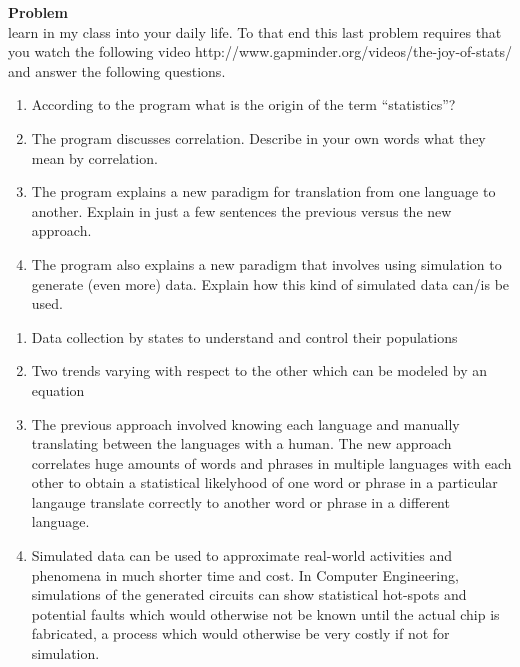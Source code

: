 \documentclass[12pt]{article}
\newenvironment{Ex}{\textbf{Problem}\vspace{.75em}\\}{}
\begin{document}
\begin{enumerate}
\begin{Ex}
    learn in my class into your daily life. To that end this last
    problem requires that you watch the following video
    http://www.gapminder.org/videos/the-joy-of-stats/ and answer the
    following questions.
    \begin{enumerate}
    \item According to the program what is the origin of the term
      ``statistics''?
    \item The program discusses correlation. Describe in your own
      words what they mean by correlation.
    \item The program explains a new paradigm for translation from one
      language to another. Explain in just a few sentences the
      previous versus the new approach.
    \item The program also explains a new paradigm that involves using
      simulation to generate (even more) data. Explain how this kind
      of simulated data can/is be used.
    \end{enumerate}
    \begin{solution} \hfill
      \begin{enumerate}
      \item Data collection by states to understand and control their
        populations
      \item Two trends varying with respect to the other which can be
        modeled by an equation
      \item The previous approach involved knowing each language and
        manually translating between the languages with a human. The
        new approach correlates huge amounts of words and phrases in
        multiple languages with each other to obtain a statistical
        likelyhood of one word or phrase in a particular langauge
        translate correctly to another word or phrase in a different
        language.
      \item Simulated data can be used to approximate real-world
        activities and phenomena in much shorter time and cost. In
        Computer Engineering, simulations of the generated circuits
        can show statistical hot-spots and potential faults which
        would otherwise not be known until the actual chip is
        fabricated, a process which would otherwise be very costly if
        not for simulation.
      \end{enumerate}
    \end{solution}
  \end{Ex}
\end{enumerate}
\end{document}
